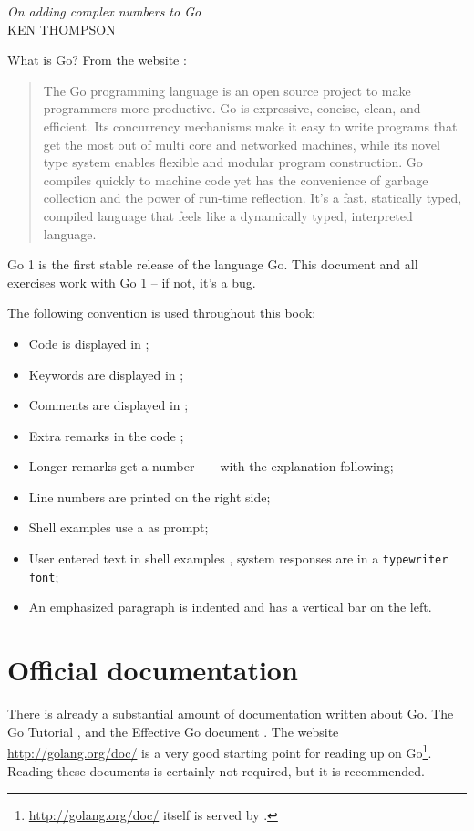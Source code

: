 {\textit{On adding complex numbers to Go}\\ \textsc{KEN THOMPSON}}

\noindent{}What is Go? From the website \cite{go_web}:
\begin{quote}
The Go programming language is an open source project to make
programmers more productive. Go is expressive, concise, clean, and
efficient. Its concurrency mechanisms make it easy to write programs
that get the most out of multi core and networked machines, while its
novel type system enables flexible and modular program construction. Go
compiles quickly to machine code yet has the convenience of garbage
collection and the power of run-time reflection. It's a fast, statically
typed, compiled language that feels like a dynamically typed,
interpreted language.
\end{quote}

Go 1 is the first stable release of the language Go. 
This document and all exercises work with Go 1 -- if not, it's a bug.

The following convention is used throughout this book:
\begin{itemize}
\item Code is displayed in ;
\item Keywords are displayed in ;
\item Comments are displayed in ;
\item Extra remarks in the code ;
\item Longer remarks get a number --  -- with the explanation following;
\item Line numbers are printed on the right side;
\item Shell examples use a \pr{} as prompt;
\item User entered text in shell examples \texttt{}, system responses
are in a \texttt{typewriter font};
\item An emphasized paragraph is indented and has a vertical bar on the
left.
\end{itemize}

\section{Official documentation}
There is already a substantial amount of documentation written about Go.
The Go Tutorial \cite{go_tutorial}, and the Effective Go
document \cite{effective_go}. The
website \url{http://golang.org/doc/} is a very good starting point
for reading up on Go\footnote{\url{http://golang.org/doc/} itself is served by 
.}. Reading these documents is
certainly not required, but it is recommended.

